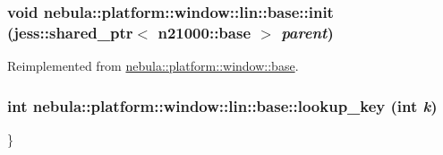 \hypertarget{classnebula_1_1platform_1_1window_1_1lin_1_1base_adc69f1c00bd65bf27f33f502cd026ffa}{
\subsubsection[{init}]{\setlength{\rightskip}{0pt plus 5cm}void nebula::platform::window::lin::base::init (jess::shared\_\-ptr$<$ {\bf n21000::base} $>$ {\em parent})}}
\label{classnebula_1_1platform_1_1window_1_1lin_1_1base_adc69f1c00bd65bf27f33f502cd026ffa}


Reimplemented from \hyperlink{classnebula_1_1platform_1_1window_1_1base_abd4bc47dc2a14a21885cc6df06c8ec43}{nebula::platform::window::base}.\hypertarget{classnebula_1_1platform_1_1window_1_1lin_1_1base_af5ca9a6a75a661884dd934dc65ea59b2}{
\subsubsection[{lookup\_\-key}]{\setlength{\rightskip}{0pt plus 5cm}int nebula::platform::window::lin::base::lookup\_\-key (int {\em k})}}
\label{classnebula_1_1platform_1_1window_1_1lin_1_1base_af5ca9a6a75a661884dd934dc65ea59b2}


\} 

